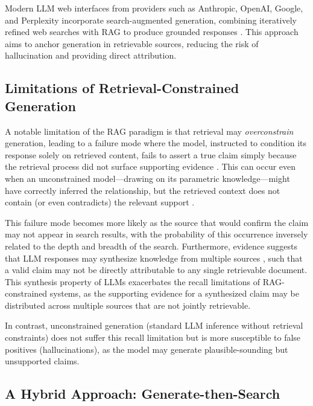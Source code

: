 Modern LLM web interfaces from providers such as Anthropic, OpenAI, Google, and Perplexity incorporate search-augmented generation, combining iteratively refined web searches with RAG to produce grounded responses \citep{wu2025clashevalquantifyingtugofwarllms}. This approach aims to anchor generation in retrievable sources, reducing the risk of hallucination and providing direct attribution.

\subsection{Limitations of Retrieval-Constrained Generation}

A notable limitation of the RAG paradigm is that retrieval may \textit{overconstrain} generation, leading to a failure mode where the model, instructed to condition its response solely on retrieved content, fails to assert a true claim simply because the retrieval process did not surface supporting evidence \citep{liu2023lostmiddle}. This can occur even when an unconstrained model---drawing on its parametric knowledge---might have correctly inferred the relationship, but the retrieved context does not contain (or even contradicts) the relevant support \citep{wu2025clashevalquantifyingtugofwarllms}.

This failure mode becomes more likely as the source that would confirm the claim may not appear in search results, with the probability of this occurrence inversely related to the depth and breadth of the search. Furthermore, evidence suggests that LLM responses may synthesize knowledge from multiple sources \citep{wang2023source,park2024identifyingsourcegenerationlarge}, such that a valid claim may not be directly attributable to any single retrievable document. This synthesis property of LLMs exacerbates the recall limitations of RAG-constrained systems, as the supporting evidence for a synthesized claim may be distributed across multiple sources that are not jointly retrievable.

In contrast, unconstrained generation (standard LLM inference without retrieval constraints) does not suffer this recall limitation but is more susceptible to false positives (hallucinations), as the model may generate plausible-sounding but unsupported claims.

\subsection{A Hybrid Approach: Generate-then-Search}
\label{sec:hybrid_generate_then_search}

